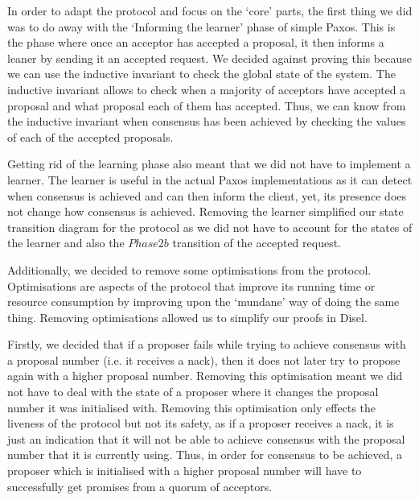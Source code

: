 In order to adapt the protocol and focus on the `core' parts, the first thing
we did was to do away with the `Informing the learner' phase of simple Paxos.
This is the phase where once an acceptor has accepted a proposal, it then informs
a leaner by sending it an accepted request. We decided against proving this
because we can use the inductive invariant to check the global state of the system.
The inductive invariant allows to check when a majority of acceptors have
accepted a proposal and what proposal each of them has accepted. Thus, we can know
from the inductive invariant when consensus has been achieved by checking the values
of each of the accepted proposals.

Getting rid of the learning phase also meant that we did not have to implement
a learner.
The learner is useful in the actual Paxos implementations as
it can detect when consensus is achieved and can then inform the client, yet, its
presence does not change how consensus is achieved. Removing the learner simplified
our state transition diagram for the protocol as we did not have to account
for the states of the learner and also the $Phase 2b$ transition of the
accepted request.

Additionally, we decided to remove some optimisations from the protocol.
Optimisations are aspects of the protocol that improve its running time or
resource consumption by improving upon the `mundane' way of doing the same
thing. Removing optimisations allowed us to simplify our proofs in Disel.

Firstly, we decided that if a proposer fails while trying to achieve
consensus with a proposal number (i.e. it receives a nack), then it does not later try
to propose again with a higher proposal number. Removing this optimisation meant we did not
have to deal with the state of a proposer where it changes the proposal number it
was initialised with. Removing this optimisation only
effects the liveness of the protocol but not its safety, as if a proposer
receives a nack, it is just an indication that it will not be able to achieve
consensus with the proposal number that it is currently using. Thus, in order
for consensus to be achieved, a proposer which is initialised with a higher
proposal number will have to successfully get promises from a quorum of acceptors.


